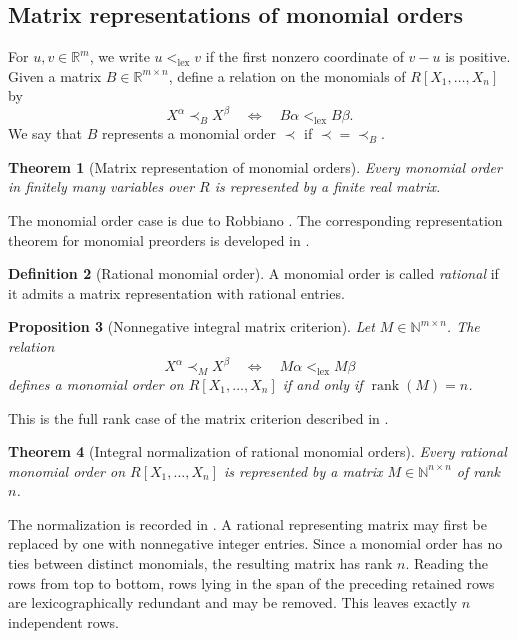 \documentclass[preprint,12pt,3p]{elsarticle}
\newtheorem{theorem}{Theorem}[section]
\newtheorem{proposition}[theorem]{Proposition}
\theoremstyle{definition}
\newtheorem{definition}[theorem]{Definition}
\theoremstyle{remark}
\newcommand{\rank}{\operatorname{rank}}
\begin{document}
	\subsection{Matrix representations of monomial orders}
	
	For $u,v\in\mathbb{R}^m$, we write
	$u<_{\mathrm{lex}}v$ if the first nonzero coordinate of $v-u$ is
	positive. Given a matrix $B\in\mathbb{R}^{m\times n}$, define a
	relation on the monomials of $R[X_1,\ldots,X_n]$ by
	\[
	X^\alpha\prec_B X^\beta
	\quad\Longleftrightarrow\quad
	B\alpha<_{\mathrm{lex}}B\beta.
	\]
	We say that $B$ represents a monomial order $\prec$ if
	$\prec=\prec_B$.
	
	\begin{theorem}[Matrix representation of monomial orders]
		\label{thm:matrix-representation}
		Every monomial order in finitely many variables over $R$ is
		represented by a finite real matrix.
	\end{theorem}
	
	The monomial order case is due to Robbiano
	\cite{Robbiano1985,Robbiano1986}. The corresponding representation
	theorem for monomial preorders is developed in
	\cite{KemperTrungAnh2018}.
	
	\begin{definition}[Rational monomial order]
		\label{def:rational-order}
		A monomial order is called \emph{rational} if it admits a matrix
		representation with rational entries.
	\end{definition}
	
	\begin{proposition}[Nonnegative integral matrix criterion]
		\label{prop:nonnegative-matrix-order}
		Let $M\in\mathbb{N}^{m\times n}$. The relation
		\[
		X^\alpha\prec_M X^\beta
		\quad\Longleftrightarrow\quad
		M\alpha<_{\mathrm{lex}}M\beta
		\]
		defines a monomial order on $R[X_1,\ldots,X_n]$ if and only if
		$\rank(M)=n$.
	\end{proposition}
	
	This is the full rank case of the matrix criterion described in
	\cite{KemperYengui2020,GuyotYengui2024}.
	
	\begin{theorem}[Integral normalization of rational monomial orders]
		\label{thm:integral-normalization}
		Every rational monomial order on $R[X_1,\ldots,X_n]$ is represented
		by a matrix $M\in\mathbb{N}^{n\times n}$ of rank $n$.
	\end{theorem}
	
	The normalization is recorded in
	\cite{KemperYengui2020,GuyotYengui2024}. A rational representing
	matrix may first be replaced by one with nonnegative integer entries.
	Since a monomial order has no ties between distinct monomials, the
	resulting matrix has rank $n$. Reading the rows from top to bottom,
	rows lying in the span of the preceding retained rows are
	lexicographically redundant and may be removed. This leaves exactly
	$n$ independent rows.
	
\end{document}
